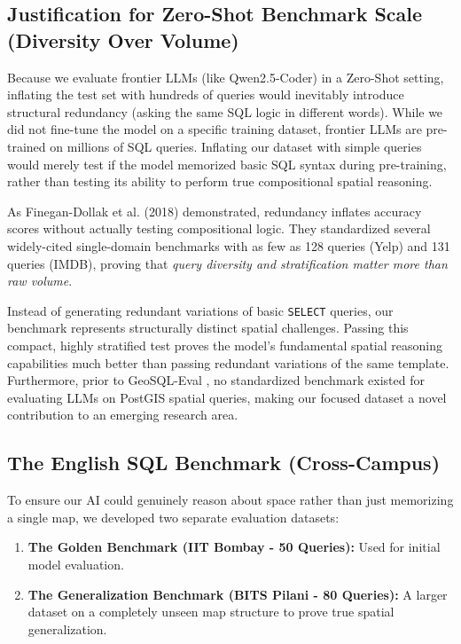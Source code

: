 \documentclass[11pt,a4paper]{article}
\begin{document}
\subsection{Justification for Zero-Shot Benchmark Scale (Diversity Over Volume)}
Because we evaluate frontier LLMs (like Qwen2.5-Coder) in a Zero-Shot setting, inflating the test set with hundreds of queries would inevitably introduce structural redundancy (asking the same SQL logic in different words). While we did not fine-tune the model on a specific training dataset, frontier LLMs are pre-trained on millions of SQL queries. Inflating our dataset with simple queries would merely test if the model memorized basic SQL syntax during pre-training, rather than testing its ability to perform true compositional spatial reasoning.

As Finegan-Dollak et al. (2018) \cite{finegan2018improving} demonstrated, redundancy inflates accuracy scores without actually testing compositional logic. They standardized several widely-cited single-domain benchmarks with as few as 128 queries (Yelp) and 131 queries (IMDB), proving that \textit{query diversity and stratification matter more than raw volume}. 

Instead of generating redundant variations of basic \texttt{SELECT} queries, our benchmark represents structurally distinct spatial challenges. Passing this compact, highly stratified test proves the model's fundamental spatial reasoning capabilities much better than passing redundant variations of the same template. Furthermore, prior to GeoSQL-Eval \cite{jiao2026geosql}, no standardized benchmark existed for evaluating LLMs on PostGIS spatial queries, making our focused dataset a novel contribution to an emerging research area.

\subsection{The English SQL Benchmark (Cross-Campus)}
To ensure our AI could genuinely reason about space rather than just memorizing a single map, we developed two separate evaluation datasets:
\begin{enumerate}
    \item \textbf{The Golden Benchmark (IIT Bombay - 50 Queries):} Used for initial model evaluation.
    \item \textbf{The Generalization Benchmark (BITS Pilani - 80 Queries):} A larger dataset on a completely unseen map structure to prove true spatial generalization.
\end{enumerate}
\end{document}
